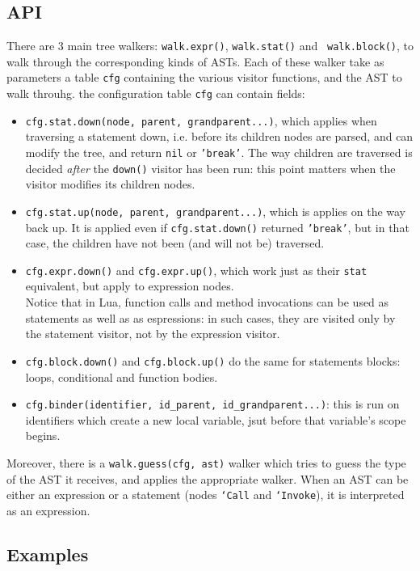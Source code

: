 \subsection{API}
There are 3 main tree walkers: {\tt walk.expr()}, {\tt walk.stat()} and {\tt
  walk.block()}, to walk through the corresponding kinds of ASTs. Each of these
walker take as parameters a table {\tt cfg} containing the various visitor
functions, and the AST to walk throuhg. the configuration table {\tt cfg} can
contain fields:
\begin{itemize}
\item {\tt cfg.stat.down(node, parent, grandparent...)}, which applies when
  traversing a statement down, i.e. before its children nodes are parsed, and
  can modify the tree, and return {\tt nil} or {\tt'break'}. The way children
  are traversed is decided {\em after} the {\tt down()} visitor has been run:
  this point matters when the visitor modifies its children nodes.
\item {\tt cfg.stat.up(node, parent, grandparent...)}, which is applies on the
  way back up. It is applied even if {\tt cfg.stat.down()} returned
  {\tt'break'}, but in that case, the children have not been (and will not be)
  traversed. 
\item {\tt cfg.expr.down()} and {\tt cfg.expr.up()}, which work just as their
  {\tt stat} equivalent, but apply to expression nodes.\\
  Notice that in Lua, function calls and method invocations can be used as
  statements as well as as espressions: in such cases, they are visited only by
  the statement visitor, not by the expression visitor.
\item {\tt cfg.block.down()} and {\tt cfg.block.up()} do the same for statements
  blocks: loops, conditional and function bodies.
\item {\tt cfg.binder(identifier, id\_parent, id\_grandparent...)}: this
  is run on identifiers which create a new local variable, jsut before that
  variable's scope begins.
\end{itemize}

Moreover, there is a {\tt walk.guess(cfg, ast)} walker which tries to guess the
type of the AST it receives, and applies the appropriate walker. When an AST can
be either an expression or a statement (nodes {\tt`Call} and {\tt`Invoke}), it
is interpreted as an expression.

\subsection{Examples}

